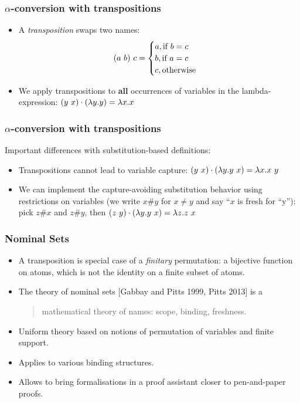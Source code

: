 \documentclass[10pt]{beamer}
\begin{document}
\begin{frame}
  \frametitle{$\alpha$-conversion with transpositions}
  \begin{itemize}
  \item A \emph{transposition} swaps two names:
    \[ (a ~ b)~c =
    \begin{cases}
      a, \text{if } b = c\\
      b, \text{if } a = c\\
      c, \text{otherwise}
    \end{cases} \]
  \item We apply transpositions to \textbf{all} occurrences of
    variables in the lambda-expression:
    $(y ~ x) \cdot (\lambda y.y) = \lambda x.x$
  \end{itemize}
\end{frame}

\begin{frame}
  \frametitle{$\alpha$-conversion with transpositions}
  Important differences with substitution-based definitions:
  \begin{itemize}
  \item Transpositions cannot lead to variable capture:
    $(y ~ x) \cdot (\lambda y.y~x) = \lambda x.x~y$
  \item We can implement the capture-avoiding substitution behavior
    using restrictions on variables (we write $x \# y$ for $x \neq y$
    and say ``$x$ is fresh for ``y''):\\
    \smallskip
    pick $z \# x$ and $z \# y$, then
    $(z ~ y) \cdot (\lambda y.y~x) = \lambda z.z~x$
  \end{itemize}
\end{frame}

\begin{frame}
  \frametitle{Nominal Sets}
  \begin{itemize}
  \item A transposition is special case of a \emph{finitary} permutation: a bijective function
    on atoms, which is not the identity on a finite subset of atoms.
    \pause
  \item The theory of nominal sets [Gabbay and Pitts 1999, Pitts 2013] is a
    \begin{quote}
    mathematical theory of names: scope, binding, freshness.
    \end{quote}
    \pause
  \item Uniform theory based on notions of permutation of variables and finite support.
     \pause
  \item Applies to various binding structures.
      \pause
  \item Allows to bring formalisations in a proof assistant closer to pen-and-paper proofs.
  \end{itemize}
\end{frame}
\end{document}
